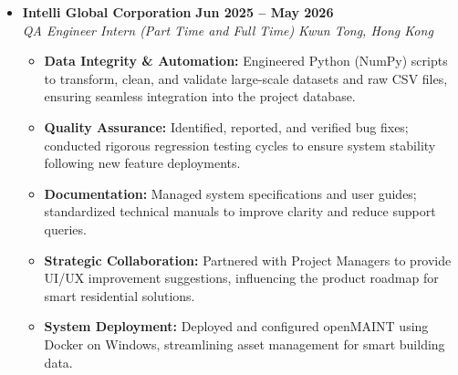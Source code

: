 \documentclass[a4paper,10pt]{article}
\begin{document}
\begin{itemize}[leftmargin=*, label={}, itemsep=1pt]
    \item \textbf{Intelli Global Corporation} \hfill \textbf{Jun 2025 -- May 2026} \\
    \textit{QA Engineer Intern (Part Time and Full Time)} \hfill \textit{Kwun Tong, Hong Kong}
    \begin{itemize}[leftmargin=1.2em, label={--}, itemsep=0pt, topsep=1pt]
        \item \textbf{Data Integrity \& Automation:} Engineered Python (NumPy) scripts to transform, clean, and validate large-scale datasets and raw CSV files, ensuring seamless integration into the project database.
        \item \textbf{Quality Assurance:} Identified, reported, and verified bug fixes; conducted rigorous regression testing cycles to ensure system stability following new feature deployments.
        \item \textbf{Documentation:} Managed system specifications and user guides; standardized technical manuals to improve clarity and reduce support queries.
        \item \textbf{Strategic Collaboration:} Partnered with Project Managers to provide UI/UX improvement suggestions, influencing the product roadmap for smart residential solutions.
        \item \textbf{System Deployment:} Deployed and configured openMAINT using Docker on Windows, streamlining asset management for smart building data.
    \end{itemize}
\end{itemize}

\end{document}
